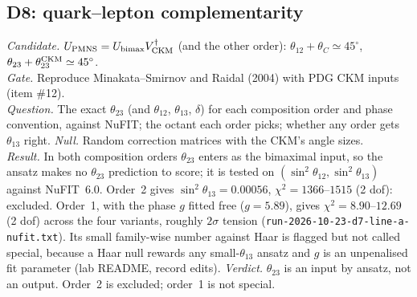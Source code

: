 \subsection{D8: quark--lepton complementarity}\label{sec:D8}
\emph{Candidate.} $U_{\rm PMNS}=U_{\rm bimax}V_{\rm CKM}^\dagger$ (and the other order):
$\theta_{12}+\theta_C\simeq45^\circ$, $\theta_{23}+\theta_{23}^{\rm CKM}\simeq45^\circ$.\\
\emph{Gate.} Reproduce Minakata--Smirnov and Raidal (2004) with PDG CKM inputs (item \#12).\\
\emph{Question.} The exact $\theta_{23}$ (and $\theta_{12}$, $\theta_{13}$, $\delta$) for each
composition order and phase convention, against NuFIT; the octant each order picks; whether any
order gets $\theta_{13}$ right. \emph{Null.} Random correction matrices with the CKM's angle
sizes.\\
\emph{Result.} In both composition orders $\theta_{23}$ enters as the bimaximal input, so the
ansatz makes no $\theta_{23}$ prediction to score; it is tested on $(\sin^2\theta_{12},\sin^2\theta_{13})$
against NuFIT~6.0. Order~2 gives $\sin^2\theta_{13}=0.00056$, $\chi^2=1366$--$1515$ (2 dof): excluded.
Order~1, with the phase $g$ fitted free ($g=5.89$), gives $\chi^2=8.90$--$12.69$ (2 dof) across the
four variants, roughly $2\sigma$ tension (\texttt{run-2026-10-23-d7-line-a-nufit.txt}). Its small
family-wise number against Haar is flagged but not called special, because a Haar null rewards any
small-$\theta_{13}$ ansatz and $g$ is an unpenalised fit parameter (lab README, record edits).\quad
\emph{Verdict.} $\theta_{23}$ is an input by ansatz, not an output. Order~2 is excluded; order~1 is
not special.


